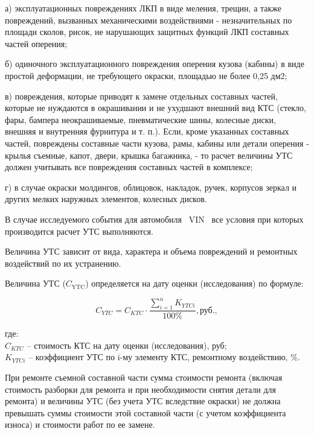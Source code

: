 а)	эксплуатационных повреждениях ЛКП в виде меления, трещин, а также повреждений, вызванных механическими воздействиями - незначительных по площади сколов, рисок, не нарушающих защитных функций ЛКП составных частей оперения;

б)	одиночного эксплуатационного повреждения оперения кузова (кабины) в виде простой деформации, не требующего окраски, площадью не более 0,25 дм2;

в)	повреждения, которые приводят к замене отдельных составных частей, которые не нуждаются в окрашивании и не ухудшают внешний вид КТС (стекло, фары, бампера неокрашиваемые, пневматические шины, колесные диски, внешняя и внутренняя фурнитура и т. п.). Если, кроме указанных составных частей, повреждены составные части кузова, рамы, кабины или детали оперения - крылья съемные, капот, двери, крышка багажника, - то расчет величины УТС должен учитывать все повреждения составных частей в комплексе;

г)	в случае окраски молдингов, облицовок, накладок, ручек, корпусов зеркал и других мелких наружных элементов, колесных дисков.

В случае исследуемого события для автомобиля \, VIN \vin\, все условия  при которых производится расчет УТС выполняются.\\


\par Величина УТС зависит от вида, характера и объема повреждений и ремонтных воздействий по их устранению.
\par Величина УТС ($ C_\text{YTC} $) определяется на дату оценки (исследования) по формуле: 

\begin{equation}\label{uts}
C_{YTC} = C_{KTC} \cdot \dfrac{\sum\limits_{i=1}^n K_{YTCi}}{100\%}, \text{руб.},
\end{equation}

\noindent где:\\
\noindent $ C_{KTC} $ -- стоимость КТС на дату оценки (исследования), руб;\\
$ K_{YTCi} $ -- коэффициент УТС по i-му элементу КТС, ремонтному воздействию, \%.
 


\par  При ремонте съемной составной части сумма стоимости ремонта (включая стоимость разборки для ремонта и при необходимости снятия детали для ремонта) и величины УТС (без учета УТС вследствие окраски) не должна превышать суммы стоимости этой составной части (с учетом коэффициента износа) и стоимости работ по ее замене.

